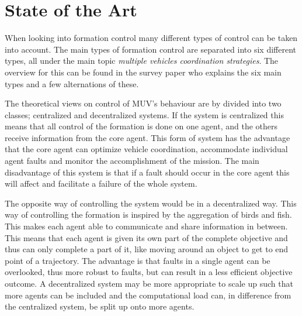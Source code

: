 \section{State of the Art}
When looking into formation control many different types of control can be taken into account. The main types of formation control are separated into six different types, all under the main topic \textit{multiple vehicles coordination strategies}. The overview for this can be found in the survey paper \citep{muv-survey} who explains the six main types and a few alternations of these.

The theoretical views on control of \ac{MUV}'s behaviour are by \citep{muv-survey} divided into two classes; centralized and decentralized systems. If the system is centralized this means that all control of the formation is done on one agent, and the others receive information from the core agent. This form of system has the advantage that the core agent can optimize vehicle coordination, accommodate individual agent faults and monitor the accomplishment of the mission. The main disadvantage of this system is that if a fault should occur in the core agent this will affect and facilitate a failure of the whole system.

The opposite way of controlling the system would be in a decentralized way. This way of controlling the formation is inspired by the aggregation of birds and fish. This makes each agent able to communicate and share information in between. This means that each agent is given its own part of the complete objective and thus can only complete a part of it, like moving around an object to get to end point of a trajectory. The advantage is that faults in a single agent can be overlooked, thus more robust to faults, but can result in a less efficient objective outcome. A decentralized system may be more appropriate to scale up such that more agents can be included and the computational load can, in difference from the centralized system, be split up onto more agents.

